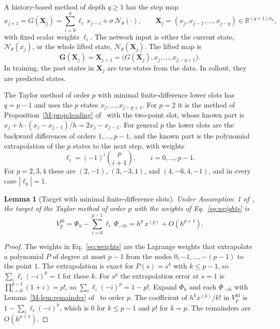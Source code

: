 \documentclass[11pt]{article}
\newcommand{\Mref}[1]{\ref{M-#1} of~\cite{main}}
\newtheorem{lemma}{Lemma}
\theoremstyle{definition}
\theoremstyle{remark}
\newcommand{\R}{\mathbb{R}}
\newcommand{\Net}{\mathcal{N}_\theta}
\newcommand{\bX}{\mathbf{X}}
\newcommand{\bG}{\mathbf{G}}
\begin{document}
A history-based method of depth $q \ge 1$ has the step map
\begin{equation}\label{eq:history-method}
x_{j+1} = G(\bX_j) = \sum_{i=0}^{q}\ell_i\,x_{j-i} + \sigma\,\Net(\cdot), \qquad \bX_j = (x_j, x_{j-1}, \dots, x_{j-q}) \in \R^{(q+1)n_{\mathrm x}},
\end{equation}
with fixed scalar weights $\ell_i$.
The network input is either the current state, $\Net(x_j)$, or the whole lifted state, $\Net(\bX_j)$.
The lifted map is
\begin{equation}\label{eq:lifted}
\bG(\bX_j) = \bX_{j+1} = \big(G(\bX_j), x_j, \dots, x_{j-q+1}\big).
\end{equation}
In training, the past states in $\bX_j$ are true states from the data.
In rollout, they are predicted states.

The Taylor method of order $p$ with minimal finite-difference lower slots has $q = p-1$ and uses the $p$ states $x_j, \dots, x_{j-p+1}$.
For $p = 2$ it is the method of Proposition~\Mref{prop:leading} with the two-point slot, whose known part is $x_j + h\cdot(x_j - x_{j-1})/h = 2x_j - x_{j-1}$.
For general $p$ the lower slots are the backward differences of orders $1, \dots, p-1$, and the known part is the polynomial extrapolation of the $p$ states to the next step, with weights
\begin{equation}\label{eq:weights}
\ell_i = (-1)^i\binom{p}{i+1}, \qquad i = 0, \dots, p-1 .
\end{equation}
For $p = 2, 3, 4$ these are $(2,-1)$, $(3,-3,1)$, and $(4,-6,4,-1)$, and in every case $|\ell_{q}| = 1$.

\begin{lemma}[Target with minimal finite-difference slots]\label{lem:fd-target}
Under Assumption~1 of~\cite{main}, the target of the Taylor method of order $p$ with the weights of Eq.~\eqref{eq:weights} is
\begin{equation}\label{eq:fd-target}
V_p^{\mathrm{fd}} = \Phi_h - \sum_{i=0}^{p-1}\ell_i\,\Phi_{-ih} = h^p\,x^{(p)} + O(h^{p+1}) .
\end{equation}
\end{lemma}

\begin{proof}
The weights in Eq.~\eqref{eq:weights} are the Lagrange weights that extrapolate a polynomial $P$ of degree at most $p-1$ from the nodes $0, -1, \dots, -(p-1)$ to the point $1$.
The extrapolation is exact for $P(s) = s^k$ with $k \le p-1$, so $\sum_i\ell_i(-i)^k = 1$ for these $k$.
For $s^p$ the extrapolation error at $s = 1$ is $\prod_{i=0}^{p-1}(1 + i) = p!$, so $\sum_i\ell_i(-i)^p = 1 - p!$.
Expand $\Phi_h$ and each $\Phi_{-ih}$ with Lemma~\Mref{lem:remainder} to order $p$.
The coefficient of $h^kx^{(k)}/k!$ in $V_p^{\mathrm{fd}}$ is $1 - \sum_i\ell_i(-i)^k$, which is $0$ for $k \le p-1$ and $p!$ for $k = p$.
The remainders are $O(h^{p+1})$.
\end{proof}
\end{document}
